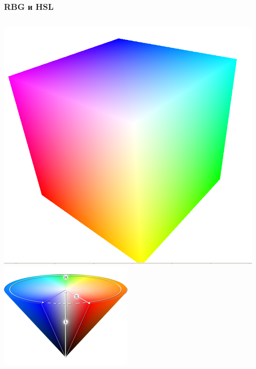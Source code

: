 \documentclass[24pt,pdf,hyperref={unicode}]{beamer}
\begin{document}
\begin{frame}\frametitle{RBG и HSL}
\begin{columns}
  \includegraphics[width=\textwidth]{Images/RGB.png} 
  \includegraphics[width=\textwidth]{Images/HSL.jpg} 
\end{columns}
\end{frame}
\end{document}
